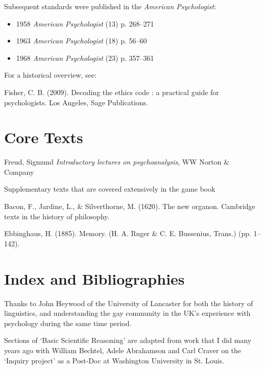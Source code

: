 \begin{refsection}
Subsequent standards were published in the \emph{American Psychologist}:

\begin{itemize}
\item 1958 \emph{American Psychologist} (13) p. 268--271

\item 1963 \emph{American Psychologist} (18) p. 56--60

\item 1968 \emph{American Psychologist} (23) p. 357--361

\end{itemize}

For a historical overview, see:

Fisher, C. B. (2009). Decoding the ethics code : a practical guide for psychologists. Los Angeles, Sage Publications.

\pagebreak 

\chapter{Core Texts}
\label{coretexts}

Freud, Sigmund \emph{Introductory lectures on psychoanalysis}, WW Norton \& Company

Supplementary texts that are covered extensively in the game book

Bacon, F., Jardine, L., \& Silverthorne, M. (1620). The new organon. Cambridge texts in the history of philosophy.

Ebbinghaus, H. (1885). Memory. (H. A. Ruger \& C. E. Bussenius, Trans.) (pp. 1–142).

\pagebreak 

\chapter{Index and Bibliographies}
\label{indexandbibliographies}


\backmatter
\printbibliography[heading=subbibliography]
\printindex




\pagebreak 

Thanks to John Heywood of the University of Lancaster for both the history of linguistics, and understanding the gay community in the UK's experience with psychology during the same time period.

Sections of `Basic Scientific Reasoning' are adapted from work that I did many years ago with William Bechtel, Adele Abrahamson and Carl Craver on the `Inquiry project' as a Post-Doc at Washington University in St. Louis.


\end{refsection}
